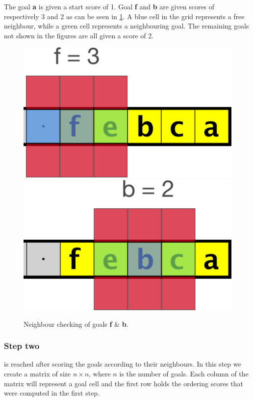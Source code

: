 The goal \textbf{a} is given a start score of 1. 
Goal \textbf{f} and \textbf{b} are given scores of respectively 3 and 2 as can be seen in \cref{fig:grid2}. 
A blue cell in the grid represents a free neighbour, while a green cell represents a neighbouring goal.
The remaining goals not shown in the figures are all given a score of 2. 

\begin{figure}[h!]
  \centering
  \includegraphics[width=.5\columnwidth]{graphics/goal_pri_3.png}
  \includegraphics[width=.5\columnwidth]{graphics/goal_pri_2.png}
  \caption{\label{fig:grid2}Neighbour checking of goals \textbf{f} \& \textbf{b}.}
\end{figure}

\subsubsection{Step two}is reached after scoring the goals according to their neighbours. 
In this step we create a matrix of size $n \times n$, where $n$ is the number of goals. 
Each column of the matrix will represent a goal cell and the first row holds the ordering scores that were computed in the first step. 

